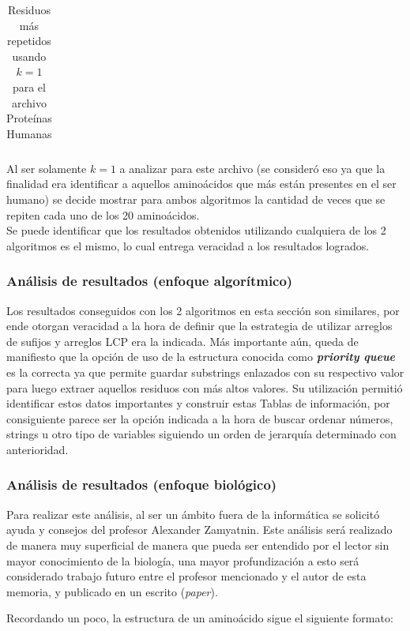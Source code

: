 \begin{table}[h]
\begin{tabular}{|c|r|r|}
\end{tabular}
\caption{Residuos más repetidos usando $k = 1$ para el archivo Proteínas Humanas}
\label{tb:labelr13}
\end{table}


Al ser solamente $k=1$ a analizar para este archivo (se consideró eso ya que la finalidad era identificar a aquellos aminoácidos que más están presentes en el ser humano) se decide mostrar para ambos algoritmos la cantidad de veces que se repiten cada uno de los 20 aminoácidos.\\
Se puede identificar que los resultados obtenidos utilizando cualquiera de los 2 algoritmos es el mismo, lo cual entrega veracidad a los resultados logrados.

\subsubsection{Análisis de resultados (enfoque algorítmico)}

Los resultados conseguidos con los 2 algoritmos en esta sección son similares, por ende otorgan veracidad a la hora de definir que la estrategia de utilizar arreglos de sufijos y arreglos LCP era la indicada. Más importante aún, queda de manifiesto que la opción de uso de la estructura conocida como \textbf{\textit{priority queue}} es la correcta ya que permite guardar substrings enlazados con su respectivo valor para luego extraer aquellos residuos con más altos valores. Su utilización permitió identificar estos datos importantes y construir estas Tablas de información, por consiguiente parece ser la opción indicada a la hora de buscar ordenar números, strings u otro tipo de variables siguiendo un orden de jerarquía determinado con anterioridad.

\subsubsection{Análisis de resultados (enfoque biológico)}

Para realizar este análisis, al ser un ámbito fuera de la informática se solicitó ayuda y consejos del profesor Alexander Zamyatnin. Este análisis será realizado de manera muy superficial de manera que pueda ser entendido por el lector sin mayor conocimiento de la biología, una mayor profundización a esto será considerado trabajo futuro entre el profesor mencionado y el autor de esta memoria, y publicado en un escrito (\textit{paper}).
 
Recordando un poco, la estructura de un aminoácido sigue el siguiente formato:

